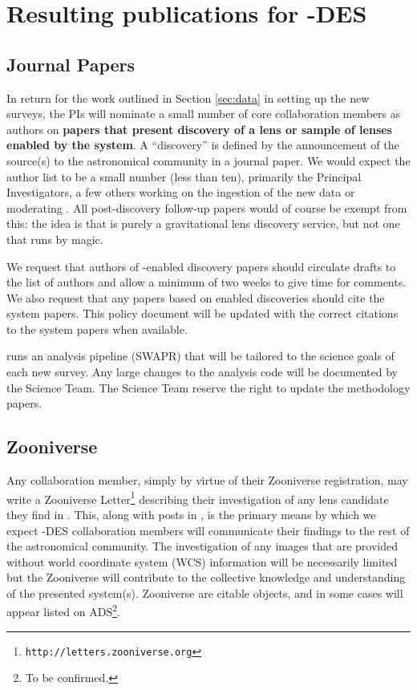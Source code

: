 \documentclass[a4paper,twocolumn]{article}
\begin{document}

\section{Resulting publications for \SW-DES }
\label{sec:series}

\subsection{Journal Papers}
\label{sec:papers}
In return for the work outlined in Section \ref{sec:data} in setting up the new surveys, the \SW PIs will nominate a
small number of core \SW collaboration members as authors on \textbf{papers that
present discovery of a lens or sample of lenses enabled by the \SW system}. A ``discovery'' is defined by the announcement of the source(s) to the astronomical community in a journal paper. We would expect the \SW author list to be a small number (less than ten), primarily the Principal Investigators, a few others working on the ingestion of the new data or moderating \Talk. All post-discovery follow-up papers would of course be exempt from this: the idea is that \SW is purely a gravitational lens discovery service, but not one that runs by magic.

We request that authors of \SW-enabled discovery papers should circulate drafts to the list of \SW authors and allow a minimum of two weeks to give time for comments. We also request that any papers based on \SW enabled discoveries should cite the \SW system papers. This policy document will be updated with the correct citations to the \SW system papers when available.

\SW runs an analysis pipeline (SWAPR) that will be tailored to the science goals of each new survey. Any large changes to the analysis code will be documented  by the \SW Science Team. The \SW Science Team reserve the right to update the \SW methodology papers.



\subsection{Zooniverse \Letters}
\label{sec:comm}

Any \SW collaboration member, simply by virtue of their Zooniverse
registration, may write a Zooniverse
Letter\footnote{\texttt{http://letters.zooniverse.org}} describing their
investigation of any lens candidate they find in \SW. This, along with
posts in  \Talk, is the primary means by which we expect \SW-DES collaboration
members will communicate their findings to the rest of the
astronomical community. The investigation of any \SW images that are
provided without world coordinate system (WCS) information will be
necessarily limited but the \SW Zooniverse \Letters will contribute to the collective knowledge and understanding of the presented system(s). Zooniverse \Letters are citable\SW
objects, and in some cases will appear listed on ADS\footnote{To be confirmed.}. 
\end{document}
